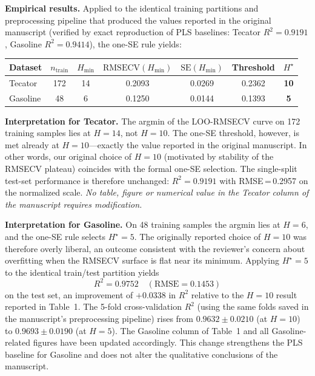 \documentclass[11pt,a4paper]{article}
\begin{document}
\medskip
\noindent\textbf{Empirical results.}
Applied to the identical training partitions and preprocessing pipeline
that produced the values reported in the original manuscript (verified
by exact reproduction of PLS baselines: Tecator $R^{2}=0.9191$, Gasoline
$R^{2}=0.9414$), the one-SE rule yields:

\begin{center}
\small
\begin{tabular}{lcccccc}
\toprule
Dataset  & $n_{\text{train}}$ & $H_{\min}$
         & $\mathrm{RMSECV}(H_{\min})$ & $\mathrm{SE}(H_{\min})$
         & Threshold & $H^{\star}$ \\
\midrule
Tecator  & 172 & 14 & 0.2093 & 0.0269 & 0.2362 & \textbf{10} \\
Gasoline & 48  & 6  & 0.1250 & 0.0144 & 0.1393 & \textbf{5}  \\
\bottomrule
\end{tabular}
\end{center}

\medskip
\noindent\textbf{Interpretation for Tecator.}
The argmin of the LOO-RMSECV curve on 172 training samples lies at
$H=14$, not $H=10$. The one-SE threshold, however, is met already at
$H=10$---exactly the value reported in the original manuscript. In
other words, our original choice of $H=10$ (motivated by stability of
the RMSECV plateau) coincides with the formal one-SE selection. The
single-split test-set performance is therefore unchanged:
$R^{2}=0.9191$ with RMSE\,=\,0.2957 on the normalized scale. \emph{No
table, figure or numerical value in the Tecator column of the manuscript
requires modification.}

\medskip
\noindent\textbf{Interpretation for Gasoline.}
On 48 training samples the argmin lies at $H=6$, and the one-SE rule
selects $H^{\star}=5$. The originally reported choice of $H=10$ was
therefore overly liberal, an outcome consistent with the reviewer's
concern about overfitting when the RMSECV surface is flat near its
minimum. Applying $H^{\star}=5$ to the identical train/test partition
yields
%
\[
\boxed{~R^{2}=0.9752 \quad(\mathrm{RMSE}=0.1453)~}
\]
%
on the test set, an improvement of $+0.0338$ in $R^{2}$ relative to the
$H=10$ result reported in Table~1. The 5-fold cross-validation $R^{2}$
(using the same folds saved in the manuscript's preprocessing pipeline)
rises from $0.9632\pm0.0210$ (at $H=10$) to $0.9693\pm0.0190$
(at $H=5$). The Gasoline column of Table~1 and all Gasoline-related
figures have been updated accordingly. This change strengthens the PLS
baseline for Gasoline and does not alter the qualitative conclusions of
the manuscript.
\end{document}
